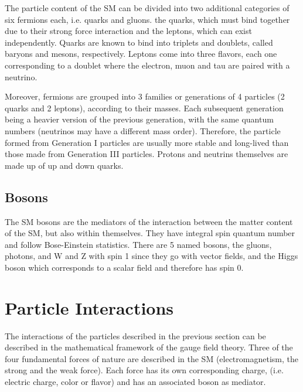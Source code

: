 The particle content of the SM can be divided into two additional categories of six fermions each, i.e. quarks and gluons. the quarks, which must bind together due to their strong force interaction and the leptons, which can exist independently. Quarks are known to bind into triplets and doublets, called baryons and mesons, respectively. Leptons come into three flavors, each one corresponding to a doublet where the electron, muon and tau are paired with a neutrino. %

Moreover, fermions are grouped into 3 families or generations of 4 particles (2 quarks and 2 leptons), according to their masses. Each subsequent generation being a heavier version of the previous generation, with the same quantum numbers (neutrinos may have a different mass order). Therefore, the particle formed from Generation I particles are usually more stable and long-lived than those made from Generation III particles. Protons and neutrins themselves are made up of up and down quarks.



\subsection{Bosons}
The SM bosons are the mediators of the interaction between the matter content of the SM, but also within themselves. They have integral spin quantum number and follow Bose-Einstein statistics. There are 5 named bosons, the gluons, photons, and W and Z with spin 1 since they go with vector fields, and the Higgs boson which corresponds to a scalar field and therefore has spin 0.

\section{Particle Interactions}
The interactions of the particles described in the previous section can be described in the mathematical framework of the gauge field theory. Three of the four fundamental forces of nature are described in the SM (electromagnetism, the strong and the weak force). Each force has its own corresponding charge, (i.e. electric charge, color or flavor) and has an associated boson as mediator.

